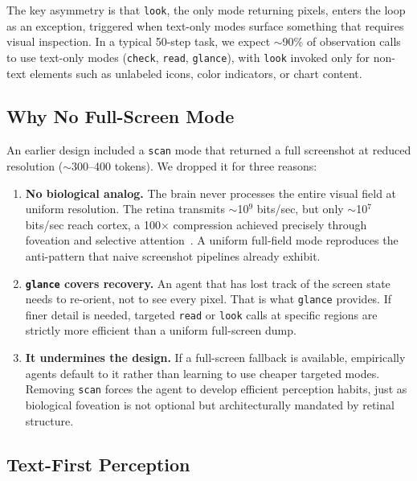 \documentclass[11pt,a4paper]{article}
\begin{document}
\noindent
The key asymmetry is that \texttt{look}, the only mode returning
pixels, enters the loop as an exception, triggered when text-only modes
surface something that requires visual inspection. In a typical 50-step task,
we expect $\sim$90\% of observation calls to use text-only modes
(\texttt{check}, \texttt{read}, \texttt{glance}), with \texttt{look} invoked
only for non-text elements such as unlabeled icons, color indicators, or chart
content.

\subsection{Why No Full-Screen Mode}
\label{sec:no-scan}

An earlier design included a \texttt{scan} mode that returned a full
screenshot at reduced resolution ($\sim$300--400 tokens). We dropped it for
three reasons:

\begin{enumerate}[leftmargin=*,itemsep=2pt]
  \item \textbf{No biological analog.} The brain never processes the entire
    visual field at uniform resolution. The retina transmits $\sim$10$^9$
    bits/sec, but only $\sim$10$^7$ bits/sec reach cortex, a 100$\times$
    compression achieved precisely through foveation and selective
    attention~\cite{wandell2007visual}. A uniform full-field mode reproduces
    the anti-pattern that naive screenshot pipelines already exhibit.
  \item \textbf{\texttt{glance} covers recovery.} An agent that has lost
    track of the screen state needs to re-orient, not to see every pixel.
    That is what \texttt{glance} provides. If finer detail is needed,
    targeted \texttt{read} or \texttt{look} calls at specific regions are
    strictly more efficient than a uniform full-screen dump.
  \item \textbf{It undermines the design.} If a full-screen fallback is
    available, empirically agents default to it rather than learning to use
    cheaper targeted modes. Removing \texttt{scan} forces the agent to develop
    efficient perception habits, just as biological foveation is not optional
    but architecturally mandated by retinal structure.
\end{enumerate}

\subsection{Text-First Perception}
\label{sec:text-first}
\end{document}
